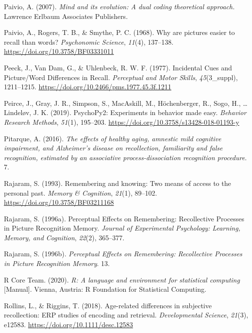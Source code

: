 \documentclass[
  11pt,
]{article}
\begin{document}
\leavevmode\hypertarget{ref-paivio2007}{}%
Paivio, A. (2007). \emph{Mind and its evolution: A dual coding
theoretical approach.} Lawrence Erlbaum Associates Publishers.

\leavevmode\hypertarget{ref-paivio1968}{}%
Paivio, A., Rogers, T. B., \& Smythe, P. C. (1968). Why are pictures
easier to recall than words? \emph{Psychonomic Science}, \emph{11}(4),
137--138. \url{https://doi.org/10.3758/BF03331011}

\leavevmode\hypertarget{ref-peeck1977}{}%
Peeck, J., Van Dam, G., \& Uhlenbeck, R. W. F. (1977). Incidental Cues
and Picture/Word Differences in Recall. \emph{Perceptual and Motor
Skills}, \emph{45}(3\_suppl), 1211--1215.
\url{https://doi.org/10.2466/pms.1977.45.3f.1211}

\leavevmode\hypertarget{ref-peirce2019}{}%
Peirce, J., Gray, J. R., Simpson, S., MacAskill, M., Höchenberger, R.,
Sogo, H., \ldots{} Lindeløv, J. K. (2019). PsychoPy2: Experiments in
behavior made easy. \emph{Behavior Research Methods}, \emph{51}(1),
195--203. \url{https://doi.org/10.3758/s13428-018-01193-y}

\leavevmode\hypertarget{ref-pitarque2016}{}%
Pitarque, A. (2016). \emph{The effects of healthy aging, amnestic mild
cognitive impairment, and Alzheimer's disease on recollection,
familiarity and false recognition, estimated by an associative
process-dissociation recognition procedure}. 7.

\leavevmode\hypertarget{ref-rajaram1993}{}%
Rajaram, S. (1993). Remembering and knowing: Two means of access to the
personal past. \emph{Memory \& Cognition}, \emph{21}(1), 89--102.
\url{https://doi.org/10.3758/BF03211168}

\leavevmode\hypertarget{ref-rajaram1996a}{}%
Rajaram, S. (1996a). Perceptual Effects on Remembering: Recollective
Processes in Picture Recognition Memory. \emph{Journal of Experimental
Psychology: Learning, Memory, and Cognition}, \emph{22}(2), 365--377.

\leavevmode\hypertarget{ref-rajaram1996}{}%
Rajaram, S. (1996b). \emph{Perceptual Effects on Remembering:
Recollective Processes in Picture Recognition Memory}. 13.

\leavevmode\hypertarget{ref-rcoreteam2020}{}%
R Core Team. (2020). \emph{R: A language and environment for statistical
computing} {[}Manual{]}. Vienna, Austria: R Foundation for Statistical
Computing.

\leavevmode\hypertarget{ref-rollins2018}{}%
Rollins, L., \& Riggins, T. (2018). Age-related differences in
subjective recollection: ERP studies of encoding and retrieval.
\emph{Developmental Science}, \emph{21}(3), e12583.
\url{https://doi.org/10.1111/desc.12583}
\end{document}
